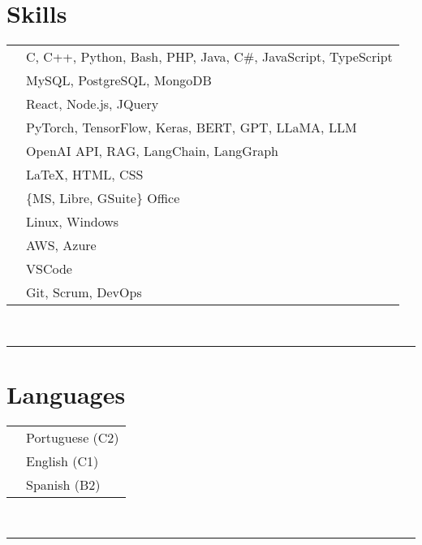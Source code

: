 \documentclass[oneside]{article}
\begin{document}
{\begin{minipage}[t][\textheight-2\fboxsep-2\fboxrule][t]{\dimexpr0.40\textwidth-2\fboxrule-2\fboxsep\relax}
        \section*{\large Skills}
        \begin{tabularx}{\textwidth}{cY}
\faCode{}             & C, C++, Python, Bash, PHP, Java, C\#, JavaScript, TypeScript \\
            \faDatabase{}         & MySQL, PostgreSQL, MongoDB \\
            \faProjectDiagram{}   & React, Node.js, JQuery \\
            \faBrain{}            & PyTorch, TensorFlow, Keras, BERT, GPT, LLaMA, LLM \\
            \faNetworkWired{}     & OpenAI API, RAG, LangChain, LangGraph \\
            \faPenNib{}           & \LaTeX, HTML, CSS \\
            \faFont{}             & \{MS, Libre, GSuite\} Office \\
            \faCogs{}             & Linux, Windows \\
            \faCloud{}            & AWS, Azure \\
            \faLaptopCode{}       & VSCode \\
            \faTools{}            & Git, Scrum, DevOps \\
        \end{tabularx}
        \vspace{1pt} \\
        \rule{\linewidth}{0.4pt}
        \section*{\large Languages}
        \begin{tabular}{cl}
            \faLanguage{} & Portuguese (C2) \\
            \faLanguage{} & English (C1) \\
            \faLanguage{} & Spanish (B2) 
        \end{tabular}
        \vspace{.3cm}
        \\ 
        \rule{\linewidth}{0.4pt}
        \\

    \end{minipage}
}
\end{document}
